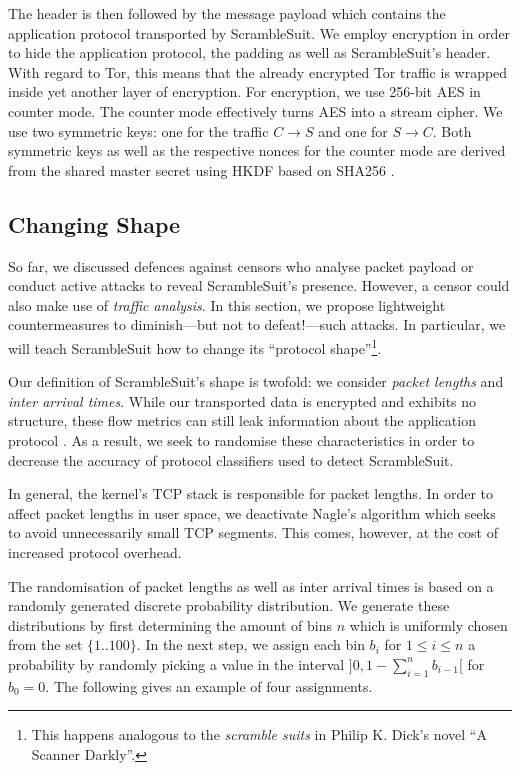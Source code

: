 \documentclass{sig-alternate}
\newcommand{\pt}{\textsf{ScrambleSuit}}
\numberwithin{enumi}{section}
\numberwithin{notesctr}{section}
\begin{document}
The header is then followed by the message payload which contains the application protocol
transported by \pt{}. We employ encryption in order to hide the application protocol, the padding as
well as \pt{}'s header. With regard to Tor, this means that the already encrypted Tor traffic is
wrapped inside yet another layer of encryption. For encryption, we use 256-bit AES in counter mode.
The counter mode effectively turns AES into a stream cipher. We use two symmetric keys: one for the
traffic $C \to S$ and one for $S \to C$. Both symmetric keys as well as the respective nonces for
the counter mode are derived from the shared master secret using HKDF based on SHA256 \cite{hkdf}.


\subsection{Changing Shape}
\label{sec:changing_shape}
So far, we discussed defences against censors who analyse packet payload or conduct active attacks
to reveal \pt{}'s presence. However, a censor could also make use of \emph{traffic analysis}. In
this section, we propose lightweight countermeasures to diminish---but not to defeat!---such
attacks. In particular, we will teach \pt{} how to change its ``protocol shape''\footnote{This
happens analogous to the \emph{scramble suits} in Philip K. Dick's novel ``A Scanner Darkly''.}.

Our definition of \pt{}'s shape is twofold: we consider \emph{packet lengths} and \emph{inter
arrival times}. While our transported data is encrypted and exhibits no structure, these flow
metrics can still leak information about the application protocol
\cite{Crotti2007,Dyer2012b,Cai2012}. As a result, we seek to randomise these characteristics in
order to decrease the accuracy of protocol classifiers used to detect \pt{}.

In general, the kernel's TCP stack is responsible for packet lengths. In order to affect packet
lengths in user space, we deactivate Nagle's algorithm which seeks to avoid unnecessarily small TCP
segments. This comes, however, at the cost of increased protocol overhead.

The randomisation of packet lengths as well as inter arrival times is based on a randomly generated
discrete probability distribution. We generate these distributions by first determining the amount
of bins $n$ which is uniformly chosen from the set $\{1..100\}$. In the next step, we assign each
bin $b_{i}$ for $1 \le i \le n$ a probability by randomly picking a value in the interval $]0, 1 -
\sum^{n}_{i=1} b_{i-1}[$ for $b_{0} = 0$. The following gives an example of four assignments.
\end{document}
